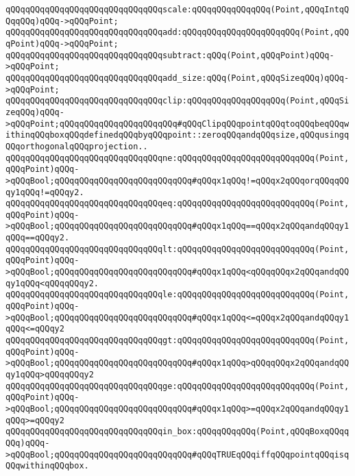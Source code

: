 \newline
\verb|qQQqqQQqqQQqqQQqqQQqqQQqqQQqqQQqscale:qQQqqQQqqQQqqQQq(Point,qQQqIntqQQqqQQq)qQQq->qQQqPoint;|\newline
\newline
\verb|qQQqqQQqqQQqqQQqqQQqqQQqqQQqqQQqadd:qQQqqQQqqQQqqQQqqQQqqQQq(Point,qQQqPoint)qQQq->qQQqPoint;|\newline
\verb|qQQqqQQqqQQqqQQqqQQqqQQqqQQqqQQqsubtract:qQQq(Point,qQQqPoint)qQQq->qQQqPoint;|\newline
\newline
\verb|qQQqqQQqqQQqqQQqqQQqqQQqqQQqqQQqadd_size:qQQq(Point,qQQqSizeqQQq)qQQq->qQQqPoint;|\newline
\verb|qQQqqQQqqQQqqQQqqQQqqQQqqQQqqQQqclip:qQQqqQQqqQQqqQQqqQQq(Point,qQQqSizeqQQq)qQQq->qQQqPoint;qQQqqQQqqQQqqQQqqQQqqQQq#qQQqClipqQQqpointqQQqtoqQQqbeqQQqwithinqQQqboxqQQqdefinedqQQqbyqQQqpoint::zeroqQQqandqQQqsize,qQQqusingqQQqorthogonalqQQqprojection..|\newline
\newline
\verb|qQQqqQQqqQQqqQQqqQQqqQQqqQQqqQQqne:qQQqqQQqqQQqqQQqqQQqqQQqqQQq(Point,qQQqPoint)qQQq->qQQqBool;qQQqqQQqqQQqqQQqqQQqqQQqqQQq#qQQqx1qQQq!=qQQqx2qQQqorqQQqqQQqy1qQQq!=qQQqy2.|\newline
\verb|qQQqqQQqqQQqqQQqqQQqqQQqqQQqqQQqeq:qQQqqQQqqQQqqQQqqQQqqQQqqQQq(Point,qQQqPoint)qQQq->qQQqBool;qQQqqQQqqQQqqQQqqQQqqQQqqQQq#qQQqx1qQQq==qQQqx2qQQqandqQQqy1qQQq==qQQqy2.|\newline
\verb|qQQqqQQqqQQqqQQqqQQqqQQqqQQqqQQqlt:qQQqqQQqqQQqqQQqqQQqqQQqqQQq(Point,qQQqPoint)qQQq->qQQqBool;qQQqqQQqqQQqqQQqqQQqqQQqqQQq#qQQqx1qQQq<qQQqqQQqx2qQQqandqQQqy1qQQq<qQQqqQQqy2.|\newline
\verb|qQQqqQQqqQQqqQQqqQQqqQQqqQQqqQQqle:qQQqqQQqqQQqqQQqqQQqqQQqqQQq(Point,qQQqPoint)qQQq->qQQqBool;qQQqqQQqqQQqqQQqqQQqqQQqqQQq#qQQqx1qQQq<=qQQqx2qQQqandqQQqy1qQQq<=qQQqy2|\newline
\verb|qQQqqQQqqQQqqQQqqQQqqQQqqQQqqQQqgt:qQQqqQQqqQQqqQQqqQQqqQQqqQQq(Point,qQQqPoint)qQQq->qQQqBool;qQQqqQQqqQQqqQQqqQQqqQQqqQQq#qQQqx1qQQq>qQQqqQQqx2qQQqandqQQqy1qQQq>qQQqqQQqy2|\newline
\verb|qQQqqQQqqQQqqQQqqQQqqQQqqQQqqQQqge:qQQqqQQqqQQqqQQqqQQqqQQqqQQq(Point,qQQqPoint)qQQq->qQQqBool;qQQqqQQqqQQqqQQqqQQqqQQqqQQq#qQQqx1qQQq>=qQQqx2qQQqandqQQqy1qQQq>=qQQqy2|\newline
\newline
\verb|qQQqqQQqqQQqqQQqqQQqqQQqqQQqqQQqin_box:qQQqqQQqqQQq(Point,qQQqBoxqQQqqQQq)qQQq->qQQqBool;qQQqqQQqqQQqqQQqqQQqqQQqqQQq#qQQqTRUEqQQqiffqQQqpointqQQqisqQQqwithinqQQqbox.|\newline
